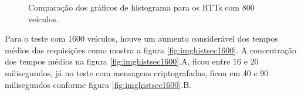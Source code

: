 \documentclass[
	12pt,				%
	oneside,			%
	a4paper,			%
	english,			%
	brazil				%
	]{abntex2ppgsi}
\begin{document}
\begin{figure}[h!]
	\caption{Comparação dos gráficos de histograma para os RTTs com 800 veículos.}
	\centering
	\label{fig:imghistsec800}
\end{figure}  

Para o teste com 1600 veículos, houve um aumento considerável dos tempos médios das requisições como mostra a figura \ref{fig:imghistsec1600}. A concentração dos tempos médios na figura \ref{fig:imghistsec1600}.A, ficou entre 16 e 20 milisegundos, já no teste com mensagens criptografadas, ficou em 40 e 90 milisegundos conforme figura \ref{fig:imghistsec1600}.B.
\end{document}
